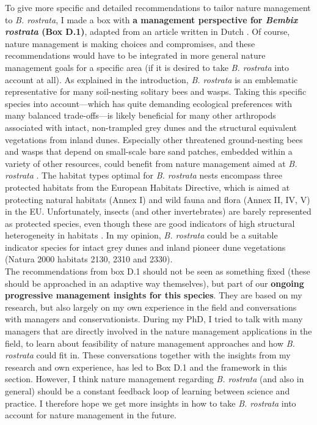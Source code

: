 \documentclass[10pt, twoside]{book} %
\begin{document}
	To give more specific and detailed recommendations to tailor nature management to \textit{B. rostrata}, I made a box with \textbf{a management perspective for \textit{Bembix rostrata} (Box D.1)}, adapted from an article written in Dutch \citep{batsleer2021b}. Of course, nature management is making choices and compromises, and these recommendations would have to be integrated in more general nature management goals for a specific area (if it is desired to take \textit{B. rostrata} into account at all). As explained in the introduction, \textit{B. rostrata} is an emblematic representative for many soil-nesting solitary bees and wasps. Taking this specific species into account---which has quite demanding ecological preferences with many balanced trade-offs---is likely beneficial for many other arthropods associated with intact, non-trampled grey dunes and the structural equivalent vegetations from inland dunes. Especially other threatened ground-nesting bees and wasps that depend on small-scale bare sand patches, embedded within a variety of other resources, could benefit from nature management aimed at \textit{B. rostrata} \citep{heneberg2013}. The habitat types optimal for \textit{B. rostrata} nests encompass three protected habitats from the European Habitats Directive, which is aimed at protecting natural habitats (Annex I) and wild fauna and flora (Annex II, IV, V) in the EU. Unfortunately, insects (and other invertebrates) are barely represented as protected species, even though these are good indicators of high structural heterogeneity in habitats \citep{vanklink2015}. In my opinion, \textit{B. rostrata} could be a suitable indicator species for intact grey dunes and inland pioneer dune vegetations (Natura 2000 habitats 2130, 2310 and 2330).\\
	
	The recommendations from box D.1 should not be seen as something fixed (these should be approached in an adaptive way themselves), but part of our \textbf{ongoing progressive management insights for this species}. They are based on my research, but also largely on my own experience in the field and conversations with managers and conservationists. During my PhD, I tried to talk with many managers that are directly involved in the nature management applications in the field, to learn about feasibility of nature management approaches and how \textit{B. rostrata} could fit in. These conversations together with the insights from my research and own experience, has led to Box D.1 and the framework in this section. However, I think nature management regarding \textit{B. rostrata} (and also in general) should be a constant feedback loop of learning between science and practice. I therefore hope we get more insights in how to take \textit{B. rostrata} into account for nature management in the future.\\
	
\end{document}
